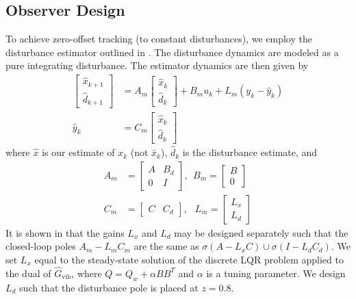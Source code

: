 \documentclass[twocolumn,twoside]{IEEEtran}
\newcommand{\x}{\ensuremath{x }\xspace}
\newcommand{\hGv}{\ensuremath{\hat{G}_{\text{vib}}}\xspace}
\begin{document}
\subsection{Observer Design}\label{sec:dist_est}
To achieve zero-offset tracking (to constant disturbances), we employ the disturbance estimator outlined in \cite{maeder_offset-free_2007}. The disturbance dynamics are modeled as a pure integrating disturbance. The estimator dynamics are then given by
\begin{align}
  \begin{bmatrix} \hat{\x}_{k+1}\\ \hat{d}_{k+1} \end{bmatrix}
  &= A_m
  \begin{bmatrix} \hat{\x}_{k}\\ \hat{d}_k\end{bmatrix}
    + B_m u_k + L_m(y_k - \hat y_k) \label{eqn:obsdyn}\\
  \hat y_k &= C_m\begin{bmatrix} \hat{\x}_k\label{eqn:yhat}\\
    \hat{d}_k \end{bmatrix}
\end{align}
where $\hat{x}$ is our estimate of $x_k$ (not $\bar{x}_k$), $\hat{d}_k$ is the disturbance estimate, and 
\begin{align}
  A_m& = \begin{bmatrix}
    A & B_d \\ 0 & I
  \end{bmatrix},\:\:
  B_m =
  \begin{bmatrix}
    B \\ 0
  \end{bmatrix} \nonumber\\
  C_m &= 
    \begin{bmatrix}
    C & C_d
  \end{bmatrix},\:\:\;
  L_m = \begin{bmatrix} L_x\\L_d \end{bmatrix} \label{eqn:CmLm}
\end{align}
It is shown in \cite{maeder_offset-free_2007} that the gains $L_x$ and $L_d$ may be designed separately such that the closed-loop poles $A_m - L_mC_m$ are the same as $\sigma(A-L_xC)\cup \sigma(I-L_dC_d)$.
We set $L_x$ equal to the steady-state solution of the discrete LQR problem applied to the dual of $\hGv$, where $Q = Q_w + \alpha BB^T$ and $\alpha$ is a tuning parameter. We design $L_d$ such that the disturbance pole is placed at $z=0.8$.
\end{document}
